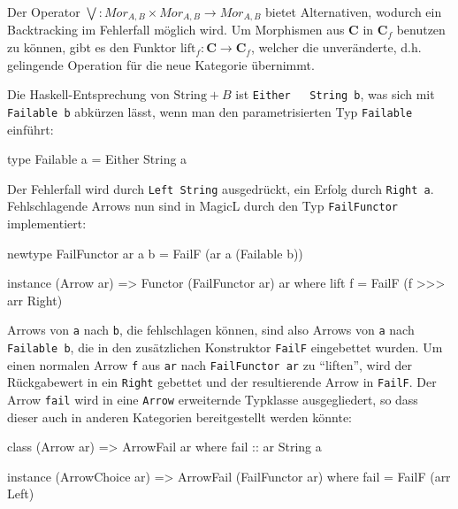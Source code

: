 \documentclass[12pt, a4paper, bibgerm]{scrbook}
\newenvironment{DIFnomarkup}{}{}
\newcommand\icode[1]{\lstinline?#1?}
\newcommand\ato{\rightarrow} %
\begin{document}
Der Operator $\bigvee : Mor_{A,B} \times Mor_{A,B}
\rightarrow Mor_{A,B} $ bietet Alternativen, wodurch ein Backtracking im
Fehlerfall möglich wird. Um Morphismen aus
$\mathbf{C}$ in $\mathbf{C}_f$ benutzen zu können, gibt es den Funktor
$\mathrm{lift}_f:\mathbf{C} \ato \mathbf{C}_f$, welcher die
unveränderte, d.h. gelingende Operation für die neue Kategorie
übernimmt.

Die Haskell-Entsprechung von $\mathrm{String}+B$ ist \icode{Either
  String b}, was sich mit \icode{Failable b} abkürzen lässt, wenn man
den parametrisierten Typ \icode{Failable} einführt:

\begin{DIFnomarkup}\begin{code}
type Failable a = Either String a
\end{code}\end{DIFnomarkup}

Der Fehlerfall wird durch \icode{Left String} ausgedrückt, ein Erfolg
durch \icode{Right a}. Fehlschlagende Arrows nun sind in MagicL durch den
Typ \icode{FailFunctor} implementiert:

\begin{DIFnomarkup}\begin{code}
newtype FailFunctor ar a b = FailF (ar a (Failable b))

instance (Arrow ar) => Functor (FailFunctor ar) ar where
    lift f = FailF (f >>> arr Right)
\end{code}\end{DIFnomarkup} %

Arrows von \icode{a} nach \icode{b}, die fehlschlagen können, sind also
Arrows von \icode{a} nach \icode{Failable b}, die in den zusätzlichen
Konstruktor \icode{FailF} eingebettet wurden. Um einen normalen Arrow
\icode{f} aus \icode{ar} nach \icode{FailFunctor ar} zu "`liften"', wird
der Rückgabewert in ein \icode{Right} gebettet und der resultierende
Arrow in \icode{FailF}.
Der Arrow \icode{fail} wird in eine \icode{Arrow} erweiternde Typklasse
ausgegliedert, so dass dieser auch in anderen Kategorien bereitgestellt
werden könnte:

\begin{DIFnomarkup}\begin{code}
class (Arrow ar) => ArrowFail ar where
  fail :: ar String a

instance (ArrowChoice ar) => ArrowFail (FailFunctor ar) where
  fail = FailF (arr Left)
\end{code}\end{DIFnomarkup}
\end{document}
